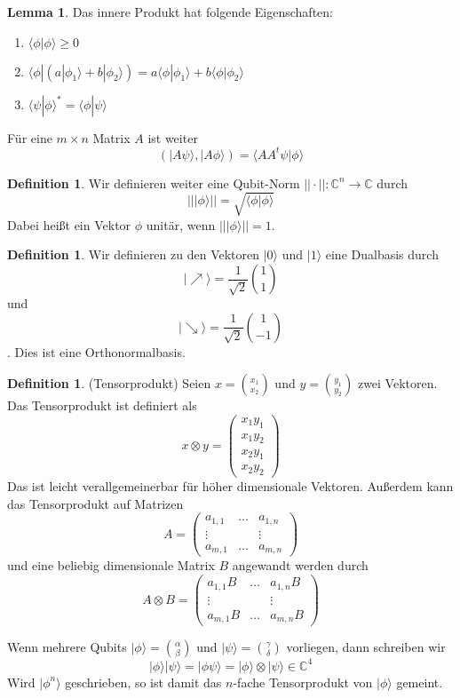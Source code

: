 \documentclass[a4paper, 12pt]{article}
\theoremstyle{plain}
\theoremstyle{definition}
\newtheorem{definition}[theorem]{Definition} %
\theoremstyle{lemma}
\newtheorem{lemma}[theorem]{Lemma}
\theoremstyle{remark}
\theoremstyle{example}
\begin{document}
	\begin{lemma}
		Das innere Produkt hat folgende Eigenschaften:
		\begin{enumerate}
			\item $\langle \phi | \phi \rangle \geq 0$
			\item $\langle \phi | (a|\phi_1 \rangle + b|\phi_2 \rangle) = a \langle \phi | \phi_1 \rangle + b \langle \phi | \phi_2 \rangle$
			\item $\langle \psi | \phi\rangle^* = \langle \phi | \psi \rangle$
		\end{enumerate}
		Für eine $m\times n$ Matrix $A$ ist weiter \[(|A\psi \rangle , |A\phi \rangle) = \langle AA^t \psi | \phi \rangle\]
	\end{lemma}
	\begin{definition}
		Wir definieren weiter eine Qubit-Norm $||\cdot||: \mathbb{C}^n \to \mathbb{C}$ durch \[|||\phi \rangle || = \sqrt{\langle \phi | \phi \rangle}\]
		Dabei heißt ein Vektor $\phi$ unitär, wenn $|||\phi \rangle|| = 1$.
	\end{definition}

	\begin{definition}
		Wir definieren zu den Vektoren $|0\rangle$ und $|1\rangle$ eine Dualbasis durch $$|\nearrow\rangle = \frac{1}{\sqrt{2}}\binom{1}{1}$$ und $$|\searrow\rangle = \frac{1}{\sqrt{2}}\binom{1}{-1}$$. Dies ist eine Orthonormalbasis.
	\end{definition}

	\begin{definition}(Tensorprodukt)
		Seien $x = \binom{x_1}{x_2}$ und $y = \binom{y_1}{y_2}$ zwei Vektoren. Das Tensorprodukt ist definiert als \[x \otimes y = \begin{pmatrix}
			x_1y_1\\
			x_1y_2\\
			x_2y_1\\
			x_2y_2
		\end{pmatrix}\]
		Das ist leicht verallgemeinerbar für höher dimensionale Vektoren. Außerdem kann das Tensorprodukt auf Matrizen \[A = \begin{pmatrix}
			a_{1,1} & \dots & a_{1,n}\\
			\vdots & & \vdots\\
			a_{m,1} & \dots & a_{m,n}
		\end{pmatrix}\] und eine beliebig dimensionale Matrix $B$ angewandt werden durch \[A \otimes B = \begin{pmatrix}
		a_{1,1}B & \dots & a_{1,n}B\\
		\vdots & & \vdots\\
		a_{m,1}B & \dots & a_{m,n}B
	\end{pmatrix}\]
	\end{definition}
	Wenn mehrere Qubits $|\phi\rangle = \binom{\alpha}{\beta}$ und $|\psi\rangle =  \binom{\gamma}{\delta}$ vorliegen, dann schreiben wir \[|\phi\rangle |\psi\rangle = |\phi \psi \rangle = |\phi\rangle \otimes |\psi\rangle \in \mathbb{C}^4\]
	Wird $|\phi^n\rangle$ geschrieben, so ist damit das $n$-fache Tensorprodukt von $|\phi\rangle$ gemeint. 
	
\end{document}
